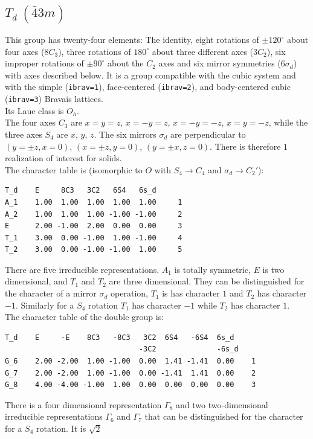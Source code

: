 \documentclass[12pt,a4paper]{article}
\begin{document}
\subsection{\color{web-blue}$T_d\ (\bar 43m)$}
This group has twenty-four elements: The identity, eight rotations 
of $\pm120^\circ$ about four axes ($8C_3$), three rotations of 
$180^\circ$ about three different axes ($3C_2$), six
improper rotations of $\pm90^\circ$ about the $C_2$ axes and
six mirror symmetries ($6\sigma_d$) with axes described below.
It is a group compatible with the cubic system and with the  
simple (\texttt{ibrav=1}), face-centered (\texttt{ibrav=2}), 
and body-centered cubic (\texttt{ibrav=3}) Bravais lattices. \\
Its Laue class is $O_{h}$. \\
The four axes $C_3$ are $x=y=z$, $x=-y=z$, $x=-y=-z$, $x=y=-z$, while
the three axes $S_4$ are $x$, $y$, $z$. 
The six mirrors $\sigma_d$ are perpendicular to $(y=\pm z, x=0)$,
$(x=\pm z, y=0)$, $(y=\pm x, z=0)$.
There is therefore $1$ realization of interest for solids. \\
The character table is (isomorphic to $O$ with $S_4 \rightarrow C_4$ and
$\sigma_d \rightarrow C_2'$):
\begin{verbatim}
T_d    E     8C3   3C2   6S4   6s_d
A_1    1.00  1.00  1.00  1.00  1.00     1
A_2    1.00  1.00  1.00 -1.00 -1.00     2
E      2.00 -1.00  2.00  0.00  0.00     3
T_1    3.00  0.00 -1.00  1.00 -1.00     4
T_2    3.00  0.00 -1.00 -1.00  1.00     5
\end{verbatim}
There are five irreducible representations. $A_1$ is totally symmetric,
$E$ is two dimensional, and $T_1$ and $T_2$ are three dimensional.
They can be distinguished for the character of a mirror $\sigma_d$ operation,
$T_1$ is has character $1$ and $T_2$ has character $-1$. 
Similarly for a $S_4$ rotation $T_1$ has character $-1$ 
while $T_2$ has character $1$. \\
The character table of the double group is:
\begin{verbatim}
T_d    E     -E    8C3   -8C3   3C2  6S4   -6S4  6s_d 
                               -3C2              -6s_d
G_6    2.00 -2.00  1.00 -1.00  0.00  1.41 -1.41  0.00    1
G_7    2.00 -2.00  1.00 -1.00  0.00 -1.41  1.41  0.00    2
G_8    4.00 -4.00 -1.00  1.00  0.00  0.00  0.00  0.00    3
\end{verbatim}
There is a four dimensional representation $\Gamma_8$ and two two-dimensional 
irreducible representations $\Gamma_6$ and $\Gamma_7$ that can be
distinguished for the character for a $S_4$ rotation. It is $\sqrt{2}$
\end{document}
